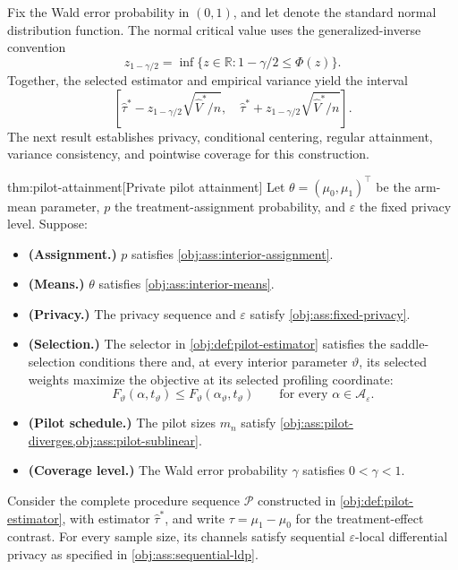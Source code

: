 \documentclass[11pt]{article}
\begin{document}
Fix the Wald error probability  in \((0,1)\), and let  denote the standard normal distribution function. The normal critical value  uses the generalized-inverse convention
\[
z_{1-\gamma/2}
=\inf\{z\in\mathbb R:1-\gamma/2\le\Phi(z)\}.
\]
Together, the selected estimator and empirical variance yield the interval
\[
\left[
\widehat\tau^*-z_{1-\gamma/2}\sqrt{\widehat V^*/n},
\quad
\widehat\tau^*+z_{1-\gamma/2}\sqrt{\widehat V^*/n}
\right].
\]
The next result establishes privacy, conditional centering, regular attainment, variance consistency, and pointwise coverage for this construction.

\begin{theoremv}{thm:pilot-attainment}[Private pilot attainment]
Let \(\theta=(\mu_0,\mu_1)^{\top}\) be the arm-mean parameter, \(p\) the treatment-assignment probability, and \(\varepsilon\) the fixed privacy level. Suppose:
\begin{itemize}
\item \textbf{(Assignment.)} \(p\) satisfies \cref{obj:ass:interior-assignment}.
\item \textbf{(Means.)} \(\theta\) satisfies \cref{obj:ass:interior-means}.
\item \textbf{(Privacy.)} The privacy sequence and \(\varepsilon\) satisfy \cref{obj:ass:fixed-privacy}.
\item \textbf{(Selection.)} The selector in \cref{obj:def:pilot-estimator} satisfies the saddle-selection conditions there and, at every interior parameter \(\vartheta\), its selected weights maximize the objective at its selected profiling coordinate:
\[
F_{\vartheta}(\alpha,t_{\vartheta})
\le F_{\vartheta}(\alpha_{\vartheta},t_{\vartheta})
\qquad
\text{for every }\alpha\in\mathcal A_{\varepsilon}.
\]
\item \textbf{(Pilot schedule.)} The pilot sizes \(m_n\) satisfy \cref{obj:ass:pilot-diverges,obj:ass:pilot-sublinear}.
\item \textbf{(Coverage level.)} The Wald error probability \(\gamma\) satisfies \(0<\gamma<1\).
\end{itemize}

Consider the complete procedure sequence \(\mathcal P\) constructed in \cref{obj:def:pilot-estimator}, with estimator \(\widehat\tau^*\), and write \(\tau=\mu_1-\mu_0\) for the treatment-effect contrast. For every sample size, its channels satisfy sequential \(\varepsilon\)-local differential privacy as specified in \cref{obj:ass:sequential-ldp}.


\end{theoremv}
\end{document}
